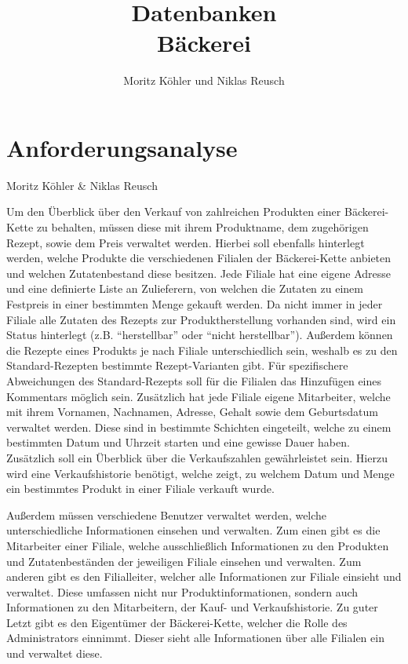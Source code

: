 \documentclass[a4paper]{article}
\title{Datenbanken \\ \large Bäckerei}
\author{Moritz Köhler und Niklas Reusch}
\begin{document}
\maketitle
\setcounter{tocdepth}{2}
\tableofcontents
\newpage



\section{Anforderungsanalyse}

\begin{flushright}
Moritz Köhler \& Niklas Reusch
\end{flushright}

Um den Überblick über den Verkauf von zahlreichen Produkten einer Bäckerei-Kette zu behalten, müssen diese mit ihrem Produktname, dem zugehörigen Rezept, sowie dem Preis verwaltet werden. Hierbei soll ebenfalls hinterlegt werden, welche Produkte die verschiedenen Filialen der Bäckerei-Kette anbieten und welchen Zutatenbestand diese besitzen. Jede Filiale hat eine eigene Adresse und eine definierte Liste an Zulieferern, von welchen die Zutaten zu einem Festpreis in einer bestimmten Menge gekauft werden.  Da nicht immer in jeder Filiale alle Zutaten des Rezepts zur Produktherstellung vorhanden sind, wird ein Status hinterlegt (z.B. “herstellbar” oder “nicht herstellbar”). Außerdem können die Rezepte eines Produkts je nach Filiale unterschiedlich sein, weshalb es zu den Standard-Rezepten bestimmte Rezept-Varianten gibt. Für spezifischere Abweichungen des Standard-Rezepts soll für die Filialen das Hinzufügen eines Kommentars möglich sein. Zusätzlich hat jede Filiale eigene Mitarbeiter, welche mit ihrem Vornamen, Nachnamen, Adresse, Gehalt sowie dem Geburtsdatum verwaltet werden. Diese sind in bestimmte Schichten eingeteilt, welche zu einem bestimmten Datum und Uhrzeit starten und eine gewisse Dauer haben. Zusätzlich soll ein Überblick über die Verkaufszahlen gewährleistet sein. Hierzu wird eine Verkaufshistorie benötigt, welche zeigt, zu welchem Datum und Menge ein bestimmtes Produkt in einer Filiale verkauft wurde.

\begin{sloppypar}
Außerdem müssen verschiedene Benutzer verwaltet werden, welche unterschiedliche Informationen einsehen und verwalten. Zum einen gibt es die Mitarbeiter einer Filiale, welche ausschließlich Informationen zu den Produkten und Zutatenbeständen der jeweiligen Filiale einsehen und verwalten. Zum anderen gibt es den Filialleiter, welcher alle Informationen zur Filiale einsieht und verwaltet. Diese umfassen nicht nur Produktinformationen, sondern auch Informationen zu den Mitarbeitern, der Kauf- und Verkaufshistorie. Zu guter Letzt gibt es den Eigentümer der Bäckerei-Kette, welcher die Rolle des Administrators einnimmt. Dieser sieht alle Informationen über alle Filialen ein und verwaltet diese.
\end{sloppypar}
\end{document}
